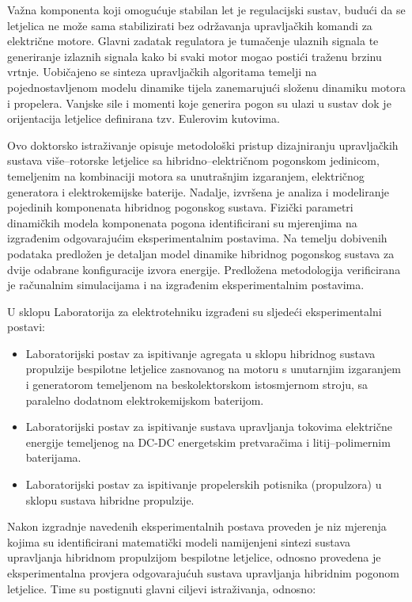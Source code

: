\begin{prosirenisazetak}
	Važna komponenta koji omogućuje stabilan let je regulacijski sustav, budući da se letjelica ne može sama stabilizirati bez održavanja upravljačkih komandi za električne motore. Glavni zadatak regulatora je tumačenje ulaznih signala te generiranje izlaznih signala kako bi svaki motor mogao postići traženu brzinu vrtnje. Uobičajeno se sinteza upravljačkih algoritama temelji na pojednostavljenom modelu dinamike tijela zanemarujući složenu dinamiku motora i propelera. Vanjske sile i momenti koje generira pogon su ulazi u sustav dok je orijentacija letjelice definirana tzv. Eulerovim kutovima. 
	
	Ovo doktorsko istraživanje opisuje metodološki pristup dizajniranju upravljačkih sustava više–rotorske letjelice sa hibridno–električnom pogonskom jedinicom, temeljenim na kombinaciji motora sa unutrašnjim izgaranjem, električnog generatora i elektrokemijske baterije. Nadalje, izvršena je analiza i modeliranje pojedinih komponenata hibridnog pogonskog sustava. Fizički parametri dinamičkih modela komponenata pogona identificirani su mjerenjima na izgrađenim odgovarajućim eksperimentalnim postavima. Na temelju dobivenih podataka predložen je detaljan model dinamike hibridnog pogonskog sustava za dvije odabrane konfiguracije izvora energije. Predložena metodologija verificirana je računalnim simulacijama i na izgrađenim eksperimentalnim postavima.

	U sklopu Laboratorija za elektrotehniku izgrađeni su sljedeći eksperimentalni postavi:

	\begin{itemize}

		\item Laboratorijski postav za ispitivanje agregata u sklopu hibridnog sustava propulzije bespilotne letjelice zasnovanog na motoru s unutarnjim izgaranjem i generatorom temeljenom na beskolektorskom istosmjernom stroju, sa paralelno dodatnom elektrokemijskom baterijom. 

		
		\item Laboratorijski postav za ispitivanje sustava upravljanja tokovima električne energije temeljenog na DC-DC energetskim pretvaračima i litij–polimernim baterijama. 

		
		\item Laboratorijski postav za ispitivanje propelerskih potisnika (propulzora) u sklopu sustava hibridne propulzije.

	\end{itemize}

	Nakon izgradnje navedenih eksperimentalnih postava proveden je niz mjerenja kojima su identificirani matematički modeli namijenjeni sintezi sustava upravljanja hibridnom propulzijom bespilotne letjelice, odnosno provedena je eksperimentalna provjera odgovarajućuh sustava upravljanja hibridnim pogonom letjelice. Time su postignuti glavni ciljevi istraživanja, odnosno: 


\end{prosirenisazetak}
